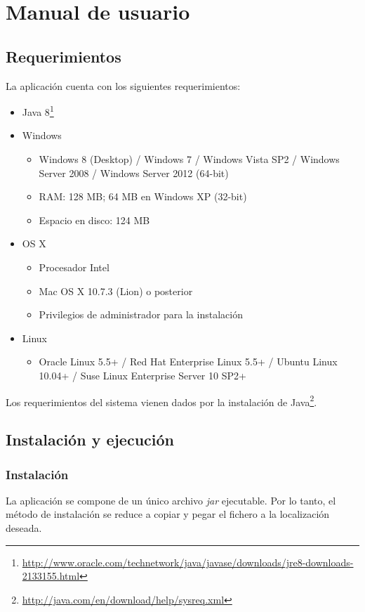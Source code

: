 
\section{Manual de usuario}

\subsection{Requerimientos}
La aplicación cuenta con los siguientes requerimientos:
\begin{itemize}
	\item Java 8\footnote{\url{http://www.oracle.com/technetwork/java/javase/downloads/jre8-downloads-2133155.html}}
	\item Windows
	\begin{itemize}
		\item Windows 8 (Desktop) / Windows 7 / Windows Vista SP2 / Windows Server 2008 / Windows Server 2012 (64-bit)
		\item RAM: 128 MB; 64 MB en Windows XP (32-bit)
		\item Espacio en disco: 124 MB
	\end{itemize}
	\item OS X
	\begin{itemize}
		\item Procesador Intel
		\item Mac OS X 10.7.3 (Lion) o posterior
		\item Privilegios de administrador para la instalación
	\end{itemize}
	\item Linux
	\begin{itemize}
		\item Oracle Linux 5.5+ / Red Hat Enterprise Linux 5.5+ / Ubuntu Linux 10.04+ / Suse Linux Enterprise Server 10 SP2+
	\end{itemize}
\end{itemize}

Los requerimientos del sistema vienen dados por la instalación de Java\footnote{\url{http://java.com/en/download/help/sysreq.xml}}.

\subsection{Instalación y ejecución}
\subsubsection{Instalación}
La aplicación se compone de un único archivo \emph{jar} ejecutable.
Por lo tanto, el método de instalación se reduce a copiar y pegar el fichero a la localización deseada.


